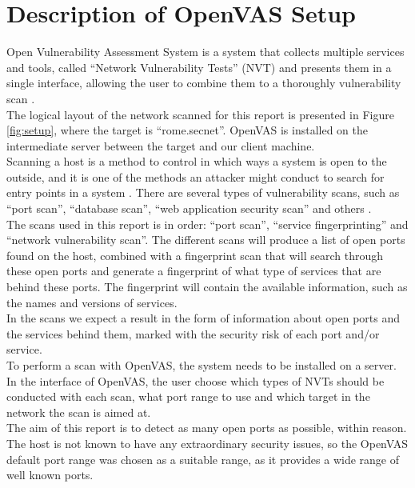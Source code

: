 \section{Description of OpenVAS Setup} \label{sec:setup}

Open Vulnerability Assessment System is a system that collects multiple services and tools, called “Network Vulnerability Tests” (NVT) and presents them in a single interface, allowing the user to combine them to a thoroughly vulnerability scan \cite{openvas}. \\

\noindent The logical layout of the network scanned for this report is presented in Figure \ref{fig:setup}, where the target is “rome.secnet”. OpenVAS is installed on the intermediate server between the target and our client machine. \\

\noindent Scanning a host is a method to control in which ways a system is open to the outside, and it is one of the methods an attacker might conduct to search for entry points in a system \cite{wiki}. There are several types of vulnerability scans, such as “port scan”, “database scan”, “web application security scan” and others \cite{hk}. \\

\noindent The scans used in this report is in order: “port scan”, “service fingerprinting” and “network vulnerability scan”. The different scans will produce a list of open ports found on the host, combined with a fingerprint scan that will search through these open ports and generate a fingerprint of what type of services that are behind these ports. The fingerprint will contain the available information, such as the names and versions of services. \\

\noindent In the scans we expect a result in the form of information about open ports and the services behind them, marked with the security risk of each port and/or service.\\

\noindent To perform a scan with OpenVAS, the system needs to be installed on a server. In the interface of OpenVAS, the user choose which types of NVTs should be conducted with each scan, what port range to use and which target in the network the scan is aimed at. \\

\noindent The aim of this report is to detect as many open ports as possible, within reason. The host is not known to have any extraordinary security issues, so the OpenVAS default port range was chosen as a suitable range, as it provides a wide range of well known ports.




